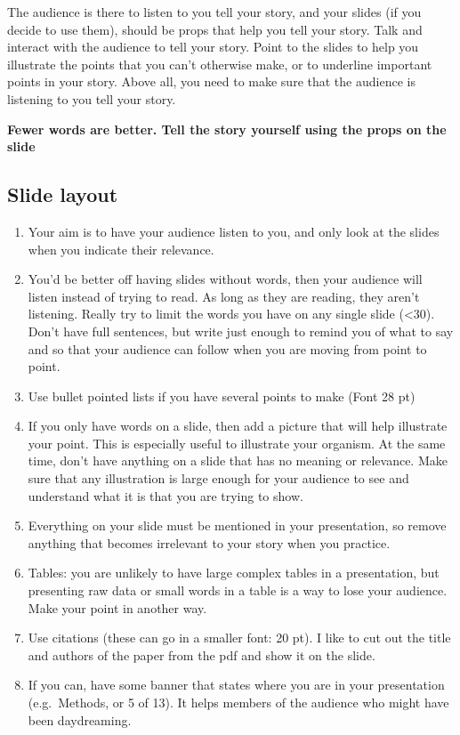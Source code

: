 \documentclass[
]{krantz}
\providecommand{\tightlist}{%
  \setlength{\itemsep}{0pt}\setlength{\parskip}{0pt}}
\begin{document}
The audience is there to listen to you tell your story, and your slides (if you decide to use them), should be props that help you tell your story. Talk and interact with the audience to tell your story. Point to the slides to help you illustrate the points that you can't otherwise make, or to underline important points in your story. Above all, you need to make sure that the audience is listening to you tell your story.

\textbf{Fewer words are better. Tell the story yourself using the props on the slide}

\hypertarget{slide-layout}{%
\subsection{Slide layout}\label{slide-layout}}

\begin{enumerate}
\def\labelenumi{\arabic{enumi}.}
\tightlist
\item
  Your aim is to have your audience listen to you, and only look at the slides when you indicate their relevance.
\item
  You'd be better off having slides without words, then your audience will listen instead of trying to read. As long as they are reading, they aren't listening. Really try to limit the words you have on any single slide (\textless30). Don't have full sentences, but write just enough to remind you of what to say and so that your audience can follow when you are moving from point to point.
\item
  Use bullet pointed lists if you have several points to make (Font 28 pt)
\item
  If you only have words on a slide, then add a picture that will help illustrate your point. This is especially useful to illustrate your organism. At the same time, don't have anything on a slide that has no meaning or relevance. Make sure that any illustration is large enough for your audience to see and understand what it is that you are trying to show.
\item
  Everything on your slide must be mentioned in your presentation, so remove anything that becomes irrelevant to your story when you practice.
\item
  Tables: you are unlikely to have large complex tables in a presentation, but presenting raw data or small words in a table is a way to lose your audience. Make your point in another way.
\item
  Use citations (these can go in a smaller font: 20 pt). I like to cut out the title and authors of the paper from the pdf and show it on the slide.
\item
  If you can, have some banner that states where you are in your presentation (e.g.~Methods, or 5 of 13). It helps members of the audience who might have been daydreaming.
\end{enumerate}
\end{document}
